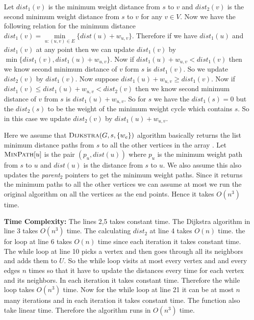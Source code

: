 \documentclass[a4paper, 11pt]{article}
\begin{document}
{\begin{algorithm}[H]
{			
		}
		\caption{$(G,s,t,W)$}
	\end{algorithm}

	Let $dist_1(v)$ is the minimum weight distance from $s$ to $v$ and $dist_2(v)$ is the second minimum weight distance from $s$ to $v$ for any $v\in V$. Now we have the following relation for the minimum distance $dist_1(v)=\min\limits_{u:(u,v)\in E}\{dist(u)+w_{u,v}\}$. Therefore if we have $dist_1(u)$ and $dist_1(v)$ at any point then we can update $dist_1(v)$ by $\min\{dist_1(v),dist_1(u)+w_{u,v}\}$. 	
Now if $dist_1(u)+w_{u,v}< dist_1(v)$ then we know second minimum distance of $v$ form $s$ is $dist_1(v)$. So we update $dist_2(v)$ by $dist_1(v)$. Now suppose $dist_1(u)+w_{u,v}\geq dist_1(v)$. Now if  $dist_1(v)\leq dist_1(u)+w_{u,v}< dist_2(v)$ then we know second minimum distance of $v$ from $s$ is $dist_1(u)+w_{u,v}$. So for $s$ we have the $dist_1(s)=0$ but the $dist_2(s)$ to be the weight of the minimum weight cycle which contains $s$. So in this case we update $dist_2(v)$ by $dist_1(u)+w_{u,v}$. 

Here we assume that $\textsc{Dijkstra}(G,s,\{w_e\})$ algorithm basically returns the list minimum distance paths from $s$ to all the other vertices in the array . Let $\textsc{MinPath}[u]$ is the pair $(p_u,dist(u))$ where $p_u$ is the minimum weight path from $s$ to $u$ and $dist(u)$ is the distance from $s$ to $u$. We also assume this also updates the \textit{parent}$_2$ pointers to get the minimum weight paths. Since it returns the minimum paths to all the other vertices we can assume at most we run the original  algorithm on all the vertices as the end points. Hence it takes $O(n^3)$ time. 

\parinf



\textbf{Time Complexity:} The lines 2,5 takes constant time. The Dijkstra algorithm in line $3$ takes $O(n^3)$ time. The calculating $dist_2$ at line 4 takes $O(n)$ time. the for loop at line 6 takes $O(n)$ time since each iteration it takes constant time.  The while loop at line 10 picks a vertex and then goes through all its neighbors  and adds them to $U$. So the while loop visits at most every vertex and and every edges $n$ times so that it have to update the distances every time for each vertex and its neighbors.  In each iteration it takes constant time. Therefore the while loop takes $O(n^3)$ time. Now for the while loop at line 21 it can be at most $n$ many iterations and in each iteration it takes constant time. The  function also take linear time. Therefore the algorithm runs in $O(n^3)$  time.\parinn
}\parinf
\end{document}

